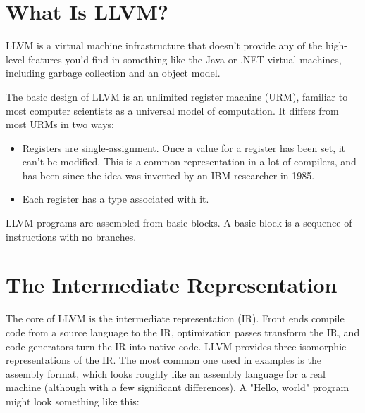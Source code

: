 \label{chap:llvm}
\section{What Is LLVM?}
LLVM is a virtual machine infrastructure that doesn’t provide any of the high-level features you’d find in something like the Java or .NET virtual machines, including garbage collection and an object model.

The basic design of LLVM is an unlimited register machine (URM), familiar to most computer scientists as a universal model of computation. It differs from most URMs in two ways:

\begin{itemize}
\item Registers are single-assignment. Once a value for a register has been set, it can’t be modified. This is a common representation in a lot of compilers, and has been since the idea was invented by an IBM researcher in 1985.
\item Each register has a type associated with it.
\end{itemize}

LLVM programs are assembled from basic blocks. A basic block is a sequence of instructions with no branches.

\section{The Intermediate Representation}

The core of LLVM is the intermediate representation (IR). Front ends compile code from a source language to the IR, optimization passes transform the IR, and code generators turn the IR into native code.
LLVM provides three isomorphic representations of the IR. The most common one used in examples is the assembly format, which looks roughly like an assembly language for a real machine (although with a few significant differences). A "Hello, world" program might look something like this:

